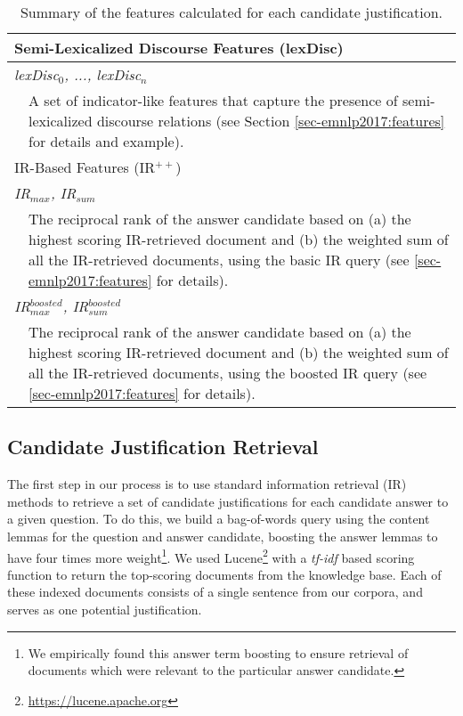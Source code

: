 \begin{table}[h!]
\begin{center}
\begin{footnotesize}
\begin{tabular}{p{0.5cm}p{12cm}}
\hline
\multicolumn{2}{l}{Semi-Lexicalized Discourse Features (lexDisc)} \\
\hline
\multicolumn{2}{l}{\emph{lexDisc$_0$, ..., lexDisc$_n$}} \\
 & A set of indicator-like features that capture the presence of semi-lexicalized discourse relations (see Section \ref{sec-emnlp2017:features} for details and example). \\
 \hline
\multicolumn{2}{l}{IR-Based Features (IR$^{++}$)} \\
\hline
\multicolumn{2}{l}{\emph{IR$_{max}$, IR$_{sum}$}} \\
 & The reciprocal rank of the answer candidate based on (a) the highest scoring IR-retrieved document and (b) the weighted sum of all the IR-retrieved documents, using the basic IR query (see \ref{sec-emnlp2017:features} for details).\\
\multicolumn{2}{l}{\emph{IR$_{max}^{boosted}$, IR$_{sum}^{boosted}$}} \\
 & The reciprocal rank of the answer candidate based on (a) the highest scoring IR-retrieved document and (b) the weighted sum of all the IR-retrieved documents, using the boosted IR query (see \ref{sec-emnlp2017:features} for details). \\

\end{tabular}
\end{footnotesize}
\caption{{ Summary of the features calculated for each candidate justification.  
 }} 
\label{tab:feature_examples}
\end{center}
\end{table}

\subsection{Candidate Justification Retrieval}
\label{sec-emnlp2017:justretrieval}
The first step in our process is to use standard information retrieval (IR) methods to retrieve a set of candidate justifications for each candidate answer to a given question.  To do this, we build a bag-of-words query using the content lemmas for the question and answer candidate, boosting the answer lemmas to have four times more weight\footnote{We empirically found this answer term boosting to ensure retrieval of documents which were relevant to the particular answer candidate.}.  We used Lucene\footnote{\url{https://lucene.apache.org}} with a \emph{tf-idf} based scoring function to return the top-scoring documents from the knowledge base.  Each of these indexed documents consists of a single sentence from our corpora, and serves as one potential justification.  

